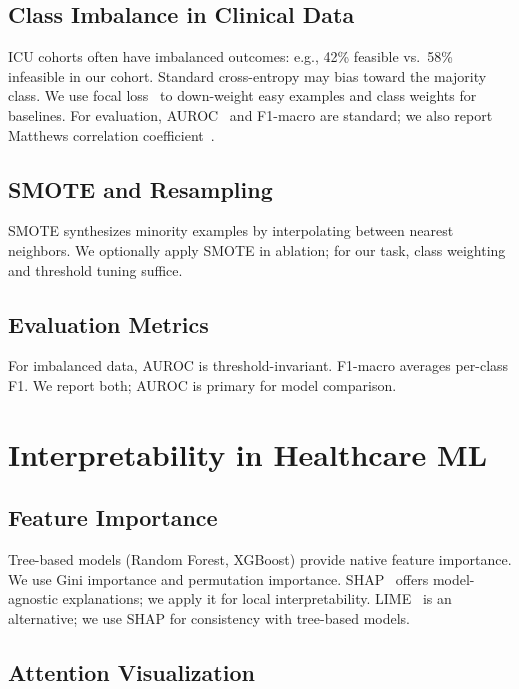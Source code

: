 \subsection{Class Imbalance in Clinical Data}

ICU cohorts often have imbalanced outcomes: e.g., 42\% feasible vs.\ 58\% infeasible in our cohort. Standard cross-entropy may bias toward the majority class. We use focal loss~\cite{lin2017focal} to down-weight easy examples and class weights for baselines. For evaluation, AUROC~\cite{hanley1982meaning} and F1-macro are standard; we also report Matthews correlation coefficient~\cite{matthews1975comparison}.

\subsection{SMOTE and Resampling}

SMOTE synthesizes minority examples by interpolating between nearest neighbors. We optionally apply SMOTE in ablation; for our task, class weighting and threshold tuning suffice.

\subsection{Evaluation Metrics}

For imbalanced data, AUROC is threshold-invariant. F1-macro averages per-class F1. We report both; AUROC is primary for model comparison.

\section{Interpretability in Healthcare ML}

\subsection{Feature Importance}

Tree-based models (Random Forest, XGBoost) provide native feature importance. We use Gini importance and permutation importance. SHAP~\cite{lundberg2017unified} offers model-agnostic explanations; we apply it for local interpretability. LIME~\cite{ribeiro2016should} is an alternative; we use SHAP for consistency with tree-based models.

\subsection{Attention Visualization}

